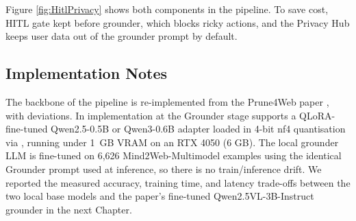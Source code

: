 Figure \ref{fig:HitlPrivacy} shows both components in the pipeline. To save cost, HITL gate kept before grounder, which blocks ricky actions, and the Privacy Hub keeps user data out of the grounder prompt by default.


\subsection{Implementation Notes}

The backbone of the pipeline is re-implemented from the Prune4Web paper \cite{zhang2025prune4web}, with deviations. In implementation at the Grounder stage supports a QLoRA-fine-tuned Qwen2.5-0.5B or Qwen3-0.6B adapter loaded in 4-bit nf4 quantisation via \cite{dettmers2023qlora}, running under 1~GB VRAM on an RTX 4050 (6 GB). The local grounder LLM  is fine-tuned on 6,626 Mind2Web-Multimodel examples using the identical Grounder prompt used at inference, so there is no train/inference drift. We reported the measured accuracy, training time, and latency trade-offs between the two local base models and the paper's fine-tuned Qwen2.5VL-3B-Instruct grounder \cite{zhang2025prune4web} in the next Chapter.
